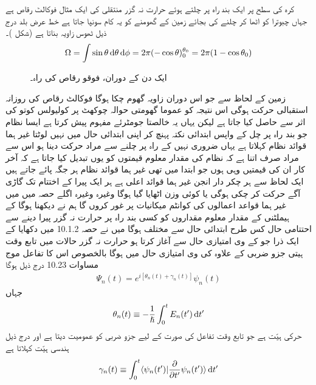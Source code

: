  کرہ کی سطح پر ایک بند راہ پر چلتے ہوئے حرارت نہ گزر منتقلی کی ایک مثال فوکالٹ  رقاص  ہے جہاں چبوترا کو اٹھا کر چلنے کی بجائے زمین کے گھومنے کو یہ کام سونپا جاتا ہے خط عرض بلد  درج ذیل ٹھوس زاویہ بناتا ہے  (شکل   )۔ 
\begin{align}
\Omega = \int \sin \theta \dif \theta \dif \phi = 2\pi (- \cos \theta)_0^{\theta_0} = 2 \pi (1 - \cos \theta_0)
\end{align}
%
\begin{figure}
\centering
{}
\caption{ایک دن کے دوران، فوقو رقاص کی راہ۔}
\label{شکل_حرارت_نا_گزر_فوقو_رقاص_ایک_دن}
\end{figure}



زمین کے لحاظ سے جو اس دوران  زاویہ گھوم چکا ہوگا فوکالٹ   رقاص   کی روزانہ استقبالی حرکت   ہوگی اس نتیجہ کو عموما گھومتی حوالہ چوکھٹ پر كوليولس کوتو کی اثر سے حاصل کیا جاتا ہے لیکن یہاں یہ خالصتا جومٹرئے مفہوم پیش کرتا ہے ایسا نظام جو بند راہ پر چل کے واپس ابتدائی نکتہ پہنچ کر اپنی ابتدائی حال میں نہیں لوٹتا غیر ہما قوائد نظام کہلاتا ہے یہاں ضروری نہیں کے راہ پر چلنے سے مراد حرکت دینا ہو اس سے مراد صرف اتنا ہے کہ نظام کی مقدار معلوم قیمتوں کو یوں تبدیل کیا جاتا ہے کہ آخر کار ان کی قیمتیں وہی ہوں جو ابتدا میں تھی غیر ہما قوائد نظام ہر جگہ پائے جاتے ہیں ایک لحاظ سے ہر چکر دار انجن غیر ہما قوائد اعلی ہے ہر ایک پیرا کے اختتام تک گاڑی آگے حرکت کر چکی ہوگی یا کوئی وزن اٹھایا گیا ہوگا وغیرہ وغیرہ اگلے حصہ میں میں غیر ہما قواعد اعمالوں کی کوانٹم میکانیات پر غور کروں گا ہم نے دیکھنا ہوگا کے ہيملٹنی کے مقدار معلوم مقداروں کو کسی بند راہ پر حرارت نہ گزر پیرا دینے سے احتتامی حال کس طرح ابتدائی حال سے مختلف ہوگا 
میں نے حصہ 10.1.2 میں دکھایا کے ایک ذرا جو  کے  وی امتیازی حال سے آغاز کرتا ہو حرارت نہ گزر حالات میں تابع وقت ہيتى جزو ضربی کے علاوہ  کی  وی امتیازی حال میں ہوگا بالخصوص اس کا تفاعل موج مساوات 10.23 درج ذیل ہوگا 
\begin{align}
\Psi_n (t) = e^{i[\theta_n (t) + \gamma_n (t)]} \psi_n (t)
\end{align} 
جہاں 
\begin{align}
\theta_n (t) \equiv - \frac{1}{\hslash} \int_0^t E_n (t') \dif t'
\end{align}
 حرکی ہیّت ہے جو تابع وقت تفاعل  کی صورت کے لیے جزو ضربی  کو عمومیت دیتا ہے اور درج ذیل ہندسی ہیّت کہلاتا ہے
\begin{align}
\gamma_n(t)\equiv \int_0^t \langle \psi_n(t')|\frac{\partial}{\partial t'}\psi_n(t')\rangle \dif t'
\end{align}

